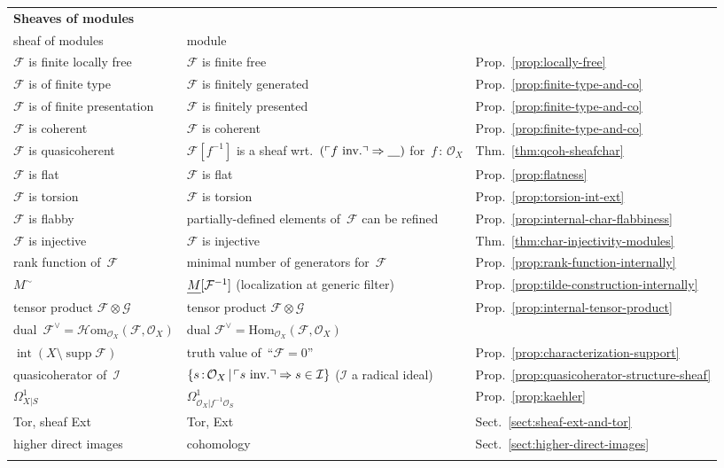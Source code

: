 \documentclass[10pt,reqno,a4paper]{amsbook}
\makeatletter
\theoremstyle{definition}
\theoremstyle{plain}
\theoremstyle{remark}
\newcommand{\F}{\mathcal{F}}
\newcommand{\G}{\mathcal{G}}
\renewcommand{\O}{\mathcal{O}}
\newcommand{\I}{\mathcal{I}}
\newcommand{\Hom}{\mathrm{Hom}}
\newcommand{\HOM}{\mathcal{H}\mathrm{om}}
\newcommand{\placeholder}{\underline{\quad}}
\let\oldul\ul
\renewcommand{\ul}[1]{\text{\oldul{$#1$}}}
\DeclareMathOperator{\Int}{int}
\DeclareMathOperator{\supp}{supp}
\newcommand{\?}{\,{:}\,}
\renewcommand{\_}{\mathpunct{.}\,}
\newcommand{\speak}[1]{\ulcorner\text{\textnormal{#1}}\urcorner}
\newcommand{\inv}{inv.\@}
\makeatother
\begin{document}
\begin{appendix}
{\begin{longtable}{@{}p{4.4cm}@{\qquad}p{6.7cm}@{\qquad}p{1.5cm}@{}}
  \textbf{Sheaves of modules} \\
  sheaf of modules & module \\
  $\F$ is finite locally free & $\F$ is finite free & Prop.\@~\ref{prop:locally-free} \\
  $\F$ is of finite type & $\F$ is finitely generated & Prop.\@~\ref{prop:finite-type-and-co} \\
  $\F$ is of finite presentation & $\F$ is finitely presented & Prop.\@~\ref{prop:finite-type-and-co} \\
  $\F$ is coherent & $\F$ is coherent & Prop.\@~\ref{prop:finite-type-and-co} \\
  $\F$ is quasicoherent & $\F[f^{-1}]$ is a sheaf wrt.\@~$(\speak{$f$ \inv} \Rightarrow \placeholder)$ for~$f\?\O_X$ & Thm.\@~\ref{thm:qcoh-sheafchar} \\
  $\F$ is flat & $\F$ is flat & Prop.\@~\ref{prop:flatness} \\
  $\F$ is torsion & $\F$ is torsion & Prop.\@~\ref{prop:torsion-int-ext} \\
  $\F$ is flabby & partially-defined elements of~$\F$ can be refined & Prop.\@~\ref{prop:internal-char-flabbiness} \\
  $\F$ is injective & $\F$ is injective & Thm.\@~\ref{thm:char-injectivity-modules} \\
  rank function of~$\F$ & minimal number of generators for~$\F$ & Prop.\@~\ref{prop:rank-function-internally} \\
  $M^\sim$ & $\ul{M}[\F^{-1}]$ (localization at generic filter) & Prop.\@~\ref{prop:tilde-construction-internally} \\
  tensor product $\F \otimes \G$ & tensor product $\F \otimes \G$ & Prop.\@~\ref{prop:internal-tensor-product} \\
  dual~$\F^\vee = \HOM_{\O_X}(\F,\O_X)$ & dual $\F^\vee = \Hom_{\O_X}(\F,\O_X)$ \\
  $\Int(X \setminus \supp\F)$ & truth value of~``$\F = 0$'' & Prop.\@~\ref{prop:characterization-support} \\
  quasicoherator of~$\I$ & $\{ s\?\O_X \,|\, \speak{$s$ \inv}
  \Rightarrow s \in \I \}$ ($\I$ a radical ideal) & Prop.\@~\ref{prop:quasicoherator-structure-sheaf} \\
  $\Omega^1_{X|S}$ & $\Omega^1_{\O_X | f^{-1}\O_S}$ & Prop.\@~\ref{prop:kaehler} \\
  Tor, sheaf Ext & Tor, Ext & Sect.\@~\ref{sect:sheaf-ext-and-tor} \\
  higher direct images & cohomology & Sect.\@~\ref{sect:higher-direct-images} \\\\


\end{longtable}}
\end{appendix}
\end{document}
